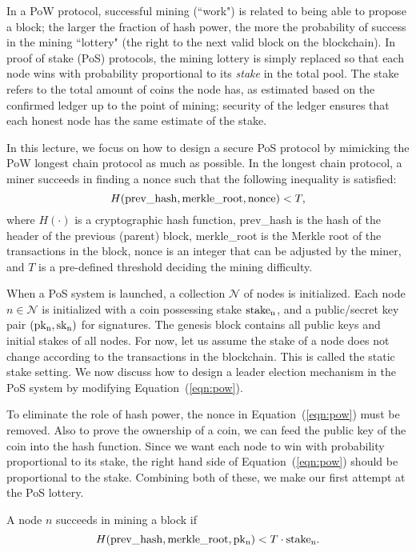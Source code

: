\documentclass{article}
\begin{document}
In a PoW protocol, successful mining (``work") is related to being able to propose a block; the larger the fraction of hash power, the more the probability of success in the mining ``lottery" (the right to the next valid block on the blockchain). In  proof of stake (PoS) protocols, the mining lottery is simply replaced so that  each node wins with probability proportional to its {\em stake} in the total pool. The stake refers to the total amount of coins the node has, as estimated based on the confirmed ledger up to the point of mining; security of the ledger ensures that each honest node has the same estimate of the stake. 



In this lecture, we focus on how to design a secure PoS protocol by mimicking the  PoW longest chain protocol as much as possible. In the longest chain protocol,  a miner succeeds in finding a {\sf nonce} such that the following inequality is satisfied:
\begin{equation}
    \label{eqn:pow}
    H{\rm (prev\_hash,merkle\_root,nonce)} < T,
\end{equation}
where $H(\cdot)$ is a cryptographic hash function, prev\_hash is the hash of the header of the previous (parent) block, merkle\_root is the Merkle root of the transactions in the block, nonce is an integer that can be adjusted by the miner, and $T$ is a pre-defined threshold deciding the mining difficulty.    

When a PoS system is launched, a collection $\mathcal{N}$ of nodes is initialized. Each node $n \in \mathcal{N}$ is initialized with a coin possessing stake ${\rm stake_n}$, and a public/secret key pair ${\rm (pk_n,sk_n)}$ for signatures. The genesis block contains all public keys and initial stakes of all nodes. For now, let us assume the stake of a node does not change according to the transactions in the blockchain. This is called the static stake setting. We now discuss how to design a leader election mechanism in the PoS system by modifying Equation~(\ref{eqn:pow}). 

To eliminate the role of hash power, the {\sf nonce} in Equation~(\ref{eqn:pow}) must be removed. Also to prove the ownership of a coin, we can feed the public key of the coin into the hash function. Since we want each node to win with probability proportional to its stake, the right hand side of Equation~(\ref{eqn:pow}) should be proportional to the stake. Combining both of these, we make our first attempt at the PoS lottery.

 A node $n$ succeeds in mining a block if
\begin{equation}
    \label{eqn:pos1}
    H{\rm (prev\_hash,merkle\_root,pk_n)} < T\cdot{\rm stake_n}.
\end{equation}
\end{document}
